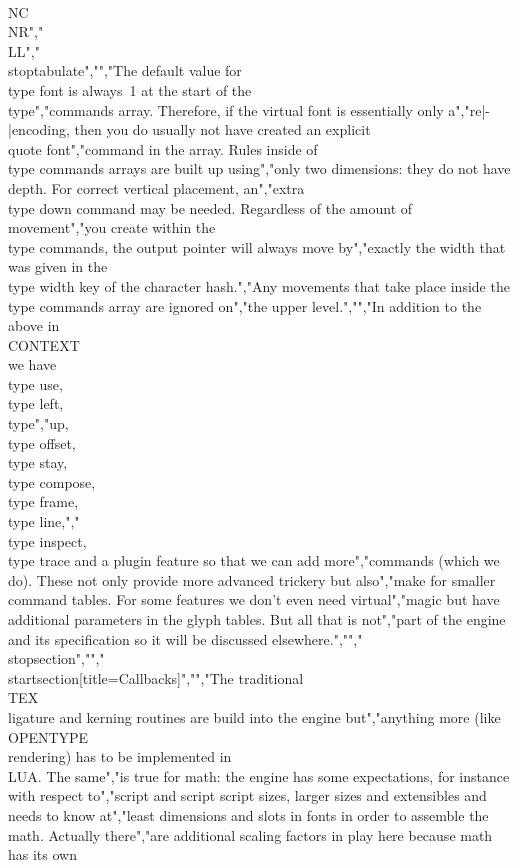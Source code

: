 \\NC \\NR","\\LL","\\stoptabulate","","The default value for \\type {font} is always~1 at the start of the \\type","{commands} array. Therefore, if the virtual font is essentially only a","re|-|encoding, then you do usually not have created an explicit \\quote {font}","command in the array. Rules inside of \\type {commands} arrays are built up using","only two dimensions: they do not have depth. For correct vertical placement, an","extra \\type {down} command may be needed. Regardless of the amount of movement","you create within the \\type {commands}, the output pointer will always move by","exactly the width that was given in the \\type {width} key of the character hash.","Any movements that take place inside the \\type {commands} array are ignored on","the upper level.","","In addition to the above in \\CONTEXT\\ we have \\type {use}, \\type {left}, \\type","{up}, \\type {offset}, \\type {stay}, \\type {compose}, \\type {frame}, \\type {line},","\\type {inspect}, \\type {trace} and a plugin feature so that we can add more","commands (which we do). These not only provide more advanced trickery but also","make for smaller command tables. For some features we don't even need virtual","magic but have additional parameters in the glyph tables. But all that is not","part of the engine and its specification so it will be discussed elsewhere.","","\\stopsection","","\\startsection[title={Callbacks}]","","The traditional \\TEX\\ ligature and kerning routines are build into the engine but","anything more (like \\OPENTYPE\\ rendering) has to be implemented in \\LUA. The same","is true for math: the engine has some expectations, for instance with respect to","script and script script sizes, larger sizes and extensibles and needs to know at","least dimensions and slots in fonts in order to assemble the math. Actually there","are additional scaling factors in play here because math has its own 